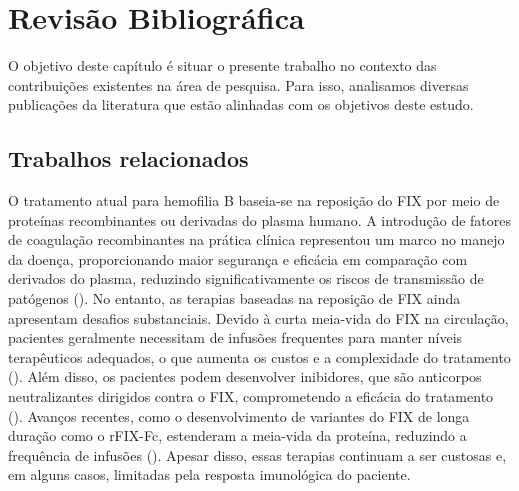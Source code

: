 
\chapter{Revisão Bibliográfica}
\label{subsection:structure_pred}

O objetivo deste capítulo é situar o presente trabalho no contexto das contribuições existentes na área de pesquisa.
Para isso, analisamos diversas publicações da literatura que estão alinhadas com os objetivos deste estudo.


\section{Trabalhos relacionados}
O tratamento atual para hemofilia B baseia-se na reposição do FIX por meio de proteínas recombinantes ou derivadas do plasma humano. 
A introdução de fatores de coagulação recombinantes na prática clínica representou um marco no manejo da doença, 
proporcionando maior segurança e eficácia em comparação com derivados do plasma, 
reduzindo significativamente os riscos de transmissão de patógenos (\cite{COHEN1995675}).  
No entanto, as terapias baseadas na reposição de FIX ainda apresentam desafios substanciais.
Devido à curta meia-vida do FIX na circulação, 
pacientes geralmente necessitam de infusões frequentes para manter níveis terapêuticos adequados,
o que aumenta os custos e a complexidade do tratamento (\cite{Mancuso}). 
Além disso, os pacientes podem desenvolver inibidores, 
que são anticorpos neutralizantes dirigidos contra o FIX,
comprometendo a eficácia do tratamento (\cite{Mancuso2}).
Avanços recentes, como o desenvolvimento de variantes do FIX de longa duração como o rFIX-Fc, 
estenderam a meia-vida da proteína, reduzindo a frequência de infusões (\cite{Massimo}). 
Apesar disso, essas terapias continuam a ser custosas e, em alguns casos,
limitadas pela resposta imunológica do paciente.  


